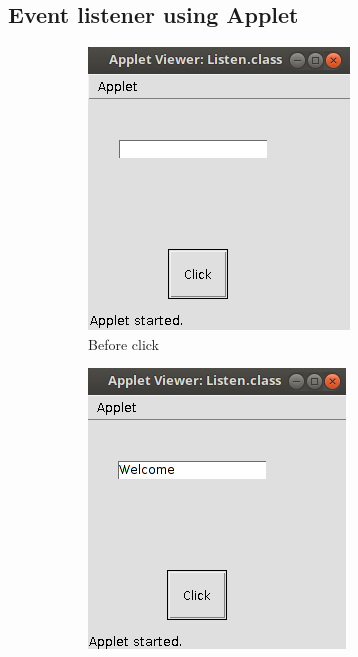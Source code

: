 \documentclass[a4paper,16pt]{article}
\begin{document}
	\subsection{Event listener using Applet}
	
	\begin{figure}[h!]
		\centering
		\begin{subfigure}[h]{0.36\linewidth}
			\includegraphics[width=\linewidth]{code/Listener/nclick}
			\caption{Before click}
		\end{subfigure}
		\hfill
		\begin{subfigure}[h]{0.39\linewidth}
			\includegraphics[width=\linewidth,height=1\linewidth]{code/Listener/click}

\end{subfigure}
\end{figure}
\end{document}
